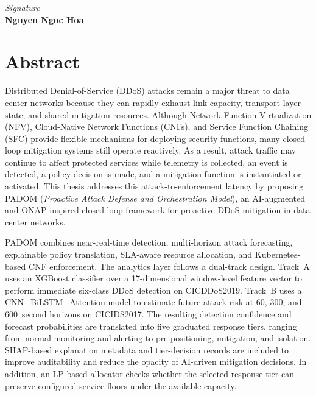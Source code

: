 \documentclass[12pt, a4paper, reqno, oneside]{book}
\newcommand{\padonap}{\textsc{PADOM}}
\begin{document}
\begin{flushright}
{\it Signature}\\[2cm]
{\bf Nguyen Ngoc Hoa}
{\bf }
\end{flushright}

\newpage

\chapter*{Abstract}
\vspace{20pt}

Distributed Denial-of-Service (DDoS) attacks remain a major threat to data
center networks because they can rapidly exhaust link capacity, transport-layer
state, and shared mitigation resources. Although Network Function
Virtualization (NFV), Cloud-Native Network Functions (CNFs), and Service
Function Chaining (SFC) provide flexible mechanisms for deploying security
functions, many closed-loop mitigation systems still operate reactively. As a
result, attack traffic may continue to affect protected services while
telemetry is collected, an event is detected, a policy decision is made, and a
mitigation function is instantiated or activated. This thesis addresses this
attack-to-enforcement latency by proposing \padonap{}
(\textit{Proactive Attack Defense and Orchestration Model}), an AI-augmented
and ONAP-inspired closed-loop framework for proactive DDoS mitigation in data
center networks.

\padonap{} combines near-real-time detection, multi-horizon attack forecasting,
explainable policy translation, SLA-aware resource allocation, and
Kubernetes-based CNF enforcement. The analytics layer follows a dual-track
design. Track~A uses an XGBoost classifier over a 17-dimensional window-level
feature vector to perform immediate six-class DDoS detection on CICDDoS2019.
Track~B uses a CNN+BiLSTM+Attention model to estimate future attack risk at
60, 300, and 600~second horizons on CICIDS2017. The resulting detection
confidence and forecast probabilities are translated into five graduated
response tiers, ranging from normal monitoring and alerting to pre-positioning,
mitigation, and isolation. SHAP-based explanation metadata and tier-decision
records are included to improve auditability and reduce the opacity of
AI-driven mitigation decisions. In addition, an LP-based allocator checks
whether the selected response tier can preserve configured service floors under
the available capacity.
\end{document}
